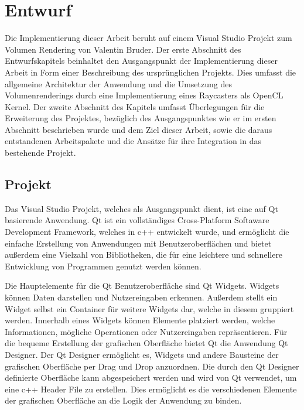 \chapter{Entwurf}\label{chap::design}
Die Implementierung dieser Arbeit beruht auf einem Visual Studio Projekt zum Volumen Rendering von Valentin Bruder.
Der erste Abschnitt des Entwurfskapitels beinhaltet den Ausgangspunkt der Implementierung dieser Arbeit in Form einer Beschreibung des ursprünglichen Projekts.
Dies umfasst die allgemeine Architektur der Anwendung und die Umsetzung des Volumenrenderings durch eine Implementierung eines Raycasters als OpenCL Kernel.
Der zweite Abschnitt des Kapitels umfasst Überlegungen für die Erweiterung des Projektes, bezüglich des Ausgangspunktes wie er im ersten Abschnitt beschrieben wurde und dem Ziel dieser Arbeit, sowie die daraus entstandenen Arbeitspakete und die Ansätze für ihre Integration in das bestehende Projekt.

\section{Projekt}\label{sec::proj}
Das Visual Studio Projekt, welches als Ausgangspunkt dient, ist eine auf Qt basierende Anwendung.
Qt ist ein vollständiges Cross-Platform Softaware Development Framework, welches in c++ entwickelt wurde, und ermöglicht die einfache Erstellung von Anwendungen mit Benutzeroberflächen und bietet außerdem eine Vielzahl von Bibliotheken, die für eine leichtere und schnellere Entwicklung von Programmen genutzt werden können.

Die Hauptelemente für die Qt Benutzeroberfläche sind Qt Widgets.
Widgets können Daten darstellen und Nutzereingaben erkennen.
Außerdem stellt ein Widget selbst ein Container für weitere Widgets dar, welche in diesem gruppiert werden.
Innerhalb eines Widgets können Elemente platziert werden, welche Informationen, mögliche Operationen oder Nutzereingaben repräsentieren.
Für die bequeme Erstellung der grafischen Oberfläche bietet Qt die Anwendung Qt Designer.
Der Qt Designer ermöglicht es, Widgets und andere Bausteine der grafischen Oberfläche per Drag und Drop anzuordnen.
Die durch den Qt Designer definierte Oberfläche kann abgespeichert werden und wird von Qt verwendet, um eine c++ Header File zu erstellen.
Dies ermöglicht es die verschiedenen Elemente der grafischen Oberfläche an die Logik der Anwendung zu binden.

